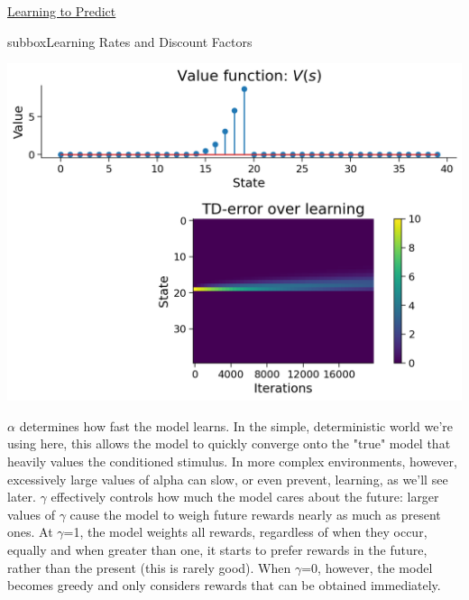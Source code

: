 \begin{textbox}{\href{https://compneuro.neuromatch.io/tutorials/W3D4_ReinforcementLearning/student/W3D4_Tutorial1.html}{Learning to Predict } }
\begin{subbox}{subbox}{Learning Rates and Discount Factors}
\begin{center}
\includegraphics[scale=0.3]{Figures/RL/RL_Figure3.png}
\end{center}
$\alpha$ determines how fast the model learns. In the simple, deterministic world
we're using here, this allows the model to quickly converge onto the "true"
model that heavily values the conditioned stimulus. In more complex environments,
however, excessively large values of alpha can slow, or even prevent, learning,
as we'll see later.
$\gamma$ effectively controls how much the model cares about the future: larger values of
$\gamma$ cause the model to weigh future rewards nearly as much as present ones. At $\gamma$=1,
the model weights all rewards, regardless of when they occur, equally and when greater than one, it
starts to prefer rewards in the future, rather than the present (this is rarely good).
When $\gamma$=0, however, the model becomes greedy and only considers rewards that
can be obtained immediately.

\end{subbox}



\end{textbox}
